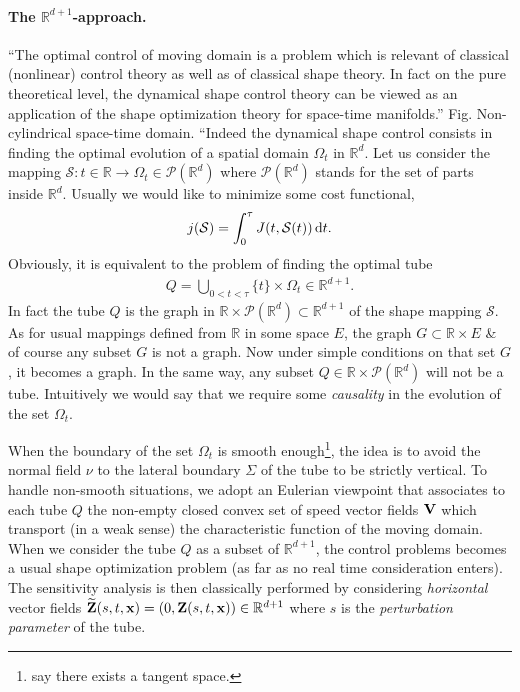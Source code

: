 \documentclass[oneside]{book}
\numberwithin{equation}{section}
\begin{document}
\paragraph{The $\mathbb{R}^{d+1}$-approach.} ``The optimal control of moving domain is a problem which is relevant of classical (nonlinear) control theory as well as of classical shape theory. In fact on the pure theoretical level, the dynamical shape control theory can be viewed as an application of the shape optimization theory for space-time manifolds.'' \textsf{Fig. Non-cylindrical space-time domain.} ``Indeed the dynamical shape control consists in finding the optimal evolution of a spatial domain $\Omega_t$ in $\mathbb{R}^d$. Let us consider the mapping $\mathcal{S}:t\in\mathbb{R}\to\Omega_t\in\mathcal{P}(\mathbb{R}^d)$ where $\mathcal{P}(\mathbb{R}^d)$ stands for the set of parts inside $\mathbb{R}^d$. Usually we would like to minimize some cost functional,
\begin{align*}
	j(\mathcal{S}) = \int_0^\tau J(t,\mathcal{S}(t))\,{\rm d}t.
\end{align*}
Obviously, it is equivalent to the problem of finding the optimal tube
\begin{align*}
	Q = \bigcup_{0 < t < \tau} \{t\}\times\Omega_t\in\mathbb{R}^{d+1}.
\end{align*}
In fact the tube $Q$ is the graph in $\mathbb{R}\times\mathcal{P}(\mathbb{R}^d)\subset\mathbb{R}^{d+1}$ of the shape mapping $\mathcal{S}$. As for usual mappings defined from $\mathbb{R}$ in some space $E$, the graph $G\subset\mathbb{R}\times E$ \& of course any subset $G$ is not a graph. Now under simple conditions on that set $G$, it becomes a graph. In the same way, any subset $Q\in\mathbb{R}\times\mathcal{P}(\mathbb{R}^d)$ will not be a tube. Intuitively we would say that we require some \textit{causality} in the evolution of the set $\Omega_t$.

When the boundary of the set $\Omega_t$ is smooth enough\footnote{say there exists a tangent space.}, the idea is to avoid the normal field $\nu$ to the lateral boundary $\Sigma$ of the tube to be strictly vertical. To handle non-smooth situations, we adopt an Eulerian viewpoint that associates to each tube $Q$ the non-empty closed convex set of speed vector fields ${\bf V}$ which transport (in a weak sense) the characteristic function of the moving domain. When we consider the tube $Q$ as a subset of $\mathbb{R}^{d+1}$, the control problems becomes a usual shape optimization problem (as far as no real time consideration enters). The sensitivity analysis is then classically performed by considering \textit{horizontal} vector fields $\widetilde{\bf Z}(s,t,{\bf x}) = (0,{\bf Z}(s,t,{\bf x}))\in\mathbb{R}^{d+1}$ where $s$ is the \textit{perturbation parameter} of the tube.
\end{document}
